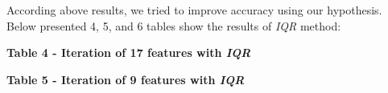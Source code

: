 According above results, we tried to improve accuracy using our
hypothesis. Below presented 4, 5, and 6 tables show the results of
\emph{IQR} method:

{\bfseries Table 4 - Iteration of 17 features with \emph{IQR}}


{\bfseries Table 5 - Iteration of 9 features with \emph{IQR}}


